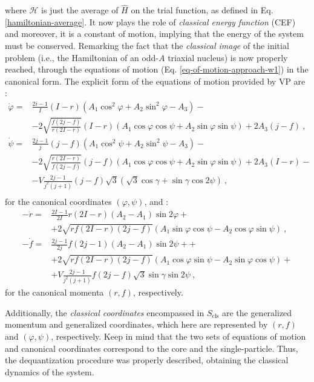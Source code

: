 where $\mathcal{H}$ is just the average of $\hat{H}$ on the trial function, as defined in Eq. \ref{hamiltonian-average}. It now plays the role of \emph{classical energy function} (CEF) and moreover, it is a constant of motion, implying that the energy of the system must be conserved. Remarking the fact that the \emph{classical image} of the initial problem (i.e., the Hamiltonian of an odd-$A$ triaxial nucleus) is now properly reached, through the equations of motion (Eq. \ref{eq-of-motion-approach-w1}) in the canonical form. The explicit form of the equations of motion provided by VP are \cite{raduta2020approach}:
\begin{align}
    \dot{\varphi}=&\frac{2i-1}{I}(I-r)\left(A_1\cos^2\varphi+A_2\sin^2\varphi-A_3\right)-\nonumber\\
                 &-2\sqrt{\frac{f(2j-f)}{r(2I-r)}}(I-r)\left(A_1\cos\varphi\cos\psi+A_2\sin\varphi\sin\psi\right)+2A_3(j-f)\ ,\nonumber\\
    \dot{\psi}=&\frac{2j-1}{j}(j-f)\left(A_1\cos^2\psi+A_2\sin^2\psi-A_3\right)-\nonumber\\
               &-2\sqrt{\frac{r(2I-r)}{f(2j-f)}}(j-f)\left(A_1\cos\varphi\cos\psi+A_2\sin\varphi\sin\psi\right)+2A_3(I-r)-\nonumber\\
               &-V\frac{2j-1}{j^2(j+1)}(j-f)\sqrt{3}\left(\sqrt{3}\cos\gamma+\sin\gamma\cos2\psi\right)\ , \nonumber\\
    \label{eq-of-motion-explicit-coordinates}
\end{align}
for the canonical coordinates $(\varphi,\psi)$, and \cite{raduta2020approach}:
\begin{align}
    -\dot{r}=&\frac{2I-1}{2I}r(2I-r)(A_2-A_1)\sin2\varphi+\nonumber\\
             &+2\sqrt{rf(2I-r)(2j-f)}\left(A_1\sin\varphi\cos\psi-A_2\cos\varphi\sin\psi\right)\ ,\nonumber\\
    -\dot{f}=&\frac{2j-1}{2j}f(2j-1)(A_2-A_1)\sin2\psi+\nonumber+\\
             &+2\sqrt{rf(2I-r)(2j-f)}\left(A_1\cos\varphi\sin\psi-A_2\sin\varphi\cos\psi\right)+\nonumber\\
             &+V\frac{2j-1}{j^2(j+1)}f(2j-f)\sqrt{3}\sin\gamma\sin2\psi\ ,
    \label{eq-of-motion-explicit-momenta}
\end{align}
for the canonical momenta $(r,f)$, respectively.

Additionally, the \emph{classical coordinates} encompassed in $S_\text{cls}$ are the generalized momentum and generalized coordinates, which here are represented by $(r,f)$ and $(\varphi,\psi)$, respectively. Keep in mind that the two sets of equations of motion and canonical coordinates correspond to the core and the single-particle. Thus, the dequantization procedure was properly described, obtaining the classical dynamics of the system.

